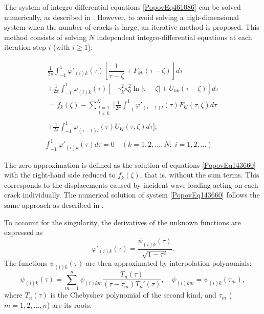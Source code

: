 The system of integro-differential equations \eqref{PopovEq461086} can be solved numerically, as described in \cite{Popov15,Popov17}. However, to avoid solving a high-dimensional system when the number of cracks is large, an iterative method is proposed. This method consists of solving \( N \) independent integro-differential equations at each iteration step \( i \) (with \( i \ge 1 \)):

\begin{equation} \label{PopovEq143660} 
	\begin{aligned}
		\begin{multlined}
			\frac{1}{2\pi} \int_{-1}^{1} \varphi'_{(i)k}(\tau) \left[ \dfrac{1}{\tau - \zeta} + F_{kk}(\tau - \zeta) \right] d\tau  
			\\
			+ \frac{1}{2\pi} \int_{-1}^{1} \varphi_{(i)k}(\tau) \left[ -\gamma_k^2 \kappa_0^2 \ln |\tau - \zeta| + U_{kk}(\tau - \zeta) \right] d\tau 
			\\
			= f_k(\zeta) - \sum_{\substack{l=1 \\ l \ne k}}^N \Bigg[ 
			\frac{1}{2\pi} \int_{-1}^{1} \varphi'_{(i-1)l}(\tau) F_{kl}(\tau, \zeta)  d\tau 
			\\ 
			+ \frac{1}{2\pi} \int_{-1}^{1} \varphi_{(i-1)l}(\tau) U_{kl}(\tau, \zeta) d\tau 
			\Bigg];
		\end{multlined}
		\\ 
		\displaystyle\int_{-1}^{1} \varphi'_{(i)k}(\tau) d\tau = 0 \quad (k = 1, 2, \dots, N; \; i = 1, 2, \dots)
	\end{aligned} 
\end{equation} 

The zero approximation is defined as the solution of equations \eqref{PopovEq143660} with the right-hand side reduced to \( f_k(\zeta) \), that is, without the sum terms. This corresponds to the displacements caused by incident wave loading acting on each crack individually. The numerical solution of system \eqref{PopovEq143660} follows the same approach as described in \cite{Popov15,Popov17}.

To account for the singularity, the derivatives of the unknown functions are expressed as
\begin{equation} \label{PopovEq992786} 
	\varphi'_{(i)k}(\tau) = \frac{\psi_{(i)k}(\tau)}{\sqrt{1 - \tau^2}}.
\end{equation} 
The functions \( \psi_{(i)k}(\tau) \) are then approximated by interpolation polynomials:
\begin{equation} \label{PopovEq972705} 
	\psi_{(i)k}(\tau) = \sum_{m=1}^{n} \psi_{(i)km} \frac{T_n(\tau)}{(\tau - \tau_m) T_n'(\tau)}, \quad 
	\psi_{(i)km} = \psi_{(i)k}(\tau_m),
\end{equation}
where \( T_n(\tau) \) is the Chebyshev polynomial of the second kind, and \( \tau_m \) (\( m = 1, 2, \dots, n \)) are its roots.

